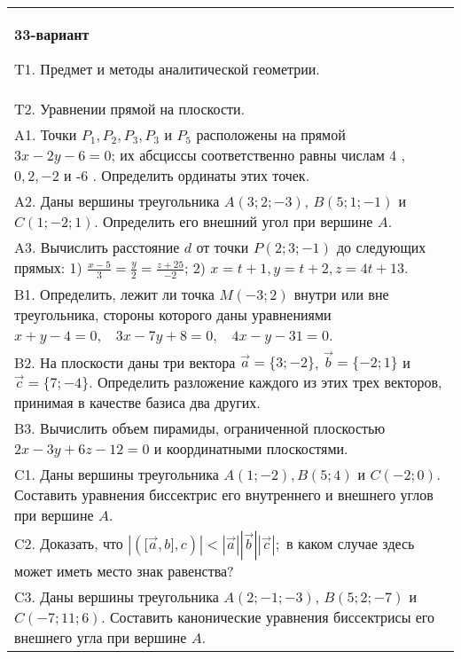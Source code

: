 \documentclass{article}
\begin{document}
\begin{tabular}{m{17cm}}
\textbf{33-вариант}
\newline

T1. Предмет и методы аналитической геометрии.
 \\
T2. Уравнении прямой на плоскости.
 \\
A1. 
Точки \(P_{1},P_{2},P_{3},P_{3}\) и \(P_{5}\) расположены на прямой \(3x - 2y - 6 = 0\); их абсциссы соответственно равны числам 4 , \(0,2, - 2\) и -6 . Определить ординаты этих точек.
 \\
A2. 
Даны вершины треугольника \(A(3;2; - 3)\), \(B(5;1; - 1)\) и \(C(1; - 2;1)\). Определить его внешний угол при вершине \(A\).
 \\
A3. 
Вычислить расстояние \(d\) от точки \(P(2;3; - 1)\) до следующих прямых: 1) \(\frac{x - 5}{3} = \frac{y}{2} = \frac{z + 25}{- 2}\); 2) \(x = t + 1,y = t + 2,z = 4t + 13\).
 \\
B1. 
Определить, лежит ли точка \(M( - 3;2)\) внутри или вне треугольника, стороны которого даны уравнениями \(x + y - 4 = 0,\ \ \ \ 3x - 7y + 8 = 0,\ \ \ \ 4x - y - 31 = 0\).
 \\
B2. 
На плоскости даны три вектора \(\overrightarrow{a} = \{ 3; - 2\}\), \(\overrightarrow{b} = \{ - 2;1\}\) и \(\overrightarrow{c} = \{ 7; - 4\}\). Определить разложение каждого из этих трех векторов, принимая в качестве базиса два других.
 \\
B3. 
Вычислить объем пирамиды, ограниченной плоскостью \(2x - 3y + 6z - 12 = 0\) и координатными плоскостями.
 \\
C1. 
Даны вершины треугольника \(A(1; - 2),B(5;4)\) и \(C( - 2;0)\). Составить уравнения биссектрис его внутреннего и внешнего углов при вершине \(A\).
 \\
C2. 
Доказать, что \(|(\lbrack\overrightarrow{a},b\rbrack,c)| <  |\overrightarrow{a}||\overrightarrow{b}||\overrightarrow{c}|;\) в каком случае здесь может иметь место знак равенства?
 \\
C3. 
Даны вершины треугольника \(A(2; - 1; - 3)\), \(B(5;2; - 7)\) и \(C( - 7;11;6)\). Составить канонические уравнения биссектрисы его внешнего угла при вершине \(A\).
 \\

\end{tabular}
\vspace{1cm}
\end{document}
